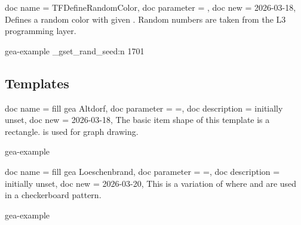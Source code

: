 \documentclass[a4paper,11pt]{article}
\begin{document}
\begin{docCommands}
  {
    {
      doc name      = TFDefineRandomColor,
      doc parameter = ,
      doc new       = 2026-03-18,
    }
  }
  Defines a random color with given . Random numbers are taken
  from the L3 programming layer.
\begin{dispExample*}{gea-example}
\ExplSyntaxOn
\sys_gset_rand_seed:n {1701}
\ExplSyntaxOff
{}
\end{dispExample*}
\end{docCommands}


\clearpage
\subsection{Templates}\label{sec:gea-templates}


\begin{docTikzKeys}
  {
    {
      doc name        = fill gea Altdorf,
      doc parameter   = {=},
      doc description = {initially unset},
      doc new         = 2026-03-18,
    }
  }
  The basic item shape of this template is a rectangle.
   is used for graph drawing.

\begin{dispExample*}{gea-example}
\end{dispExample*}
\end{docTikzKeys}




\begin{docTikzKeys}
  {
    {
      doc name        = fill gea Loeschenbrand,
      doc parameter   = {=},
      doc description = {initially unset},
      doc new         = 2026-03-20,
    }
  }
  This is a variation of  where
   and
   are used in a checkerboard pattern.

\begin{dispExample*}{gea-example}
\end{dispExample*}
\end{docTikzKeys}
\end{document}
